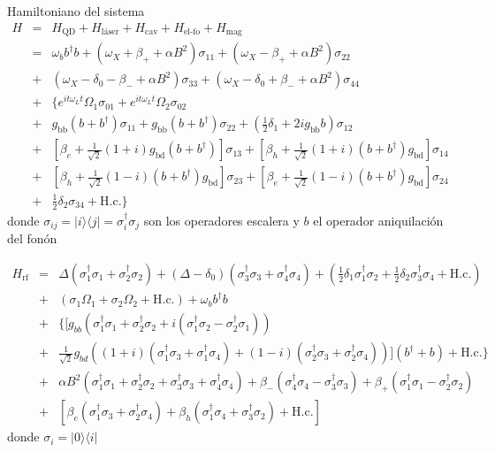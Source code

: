 \documentclass[main.tex]{subfiles}
\begin{document}
Hamiltoniano del sistema
\begin{eqnarray}
	H&=& H_\text{QD} + H_\text{láser} + H_\text{cav} + H_\text{el-fo} + H_\text{mag} \nonumber\\
	&=& \omega_b b^\dagger b + (\omega_X + \beta_+ + \alpha B^2)\sigma_{11} + (\omega_X - \beta_+ +\alpha B^2)\sigma_{22} \nonumber\\
	&+& (\omega_X - \delta_0 - \beta_- + \alpha B^2)\sigma_{33} + (\omega_X - \delta_0 + \beta_- + \alpha B^2)\sigma_{44} \nonumber\\
	&+& \{e^{it\omega_L t}\Omega_1\sigma_{01} + e^{it\omega_L t}\Omega_2\sigma_{02} \nonumber\\
	&+& g_{\text{bb}} (b+b^\dagger) \sigma_{11} + g_{\text{bb}} (b+b^\dagger) \sigma_{22} + (\tfrac{1}{2}\delta_1 + 2ig_{\text{bb}}b)\sigma_{12}\nonumber\\
	&+& [\beta_e + \tfrac{1}{\sqrt{2}} (1+i) g_{\text{bd}} (b+b^\dagger)]\sigma _{13} + [\beta_h + \tfrac{1}{\sqrt{2}}(1+i) (b+b^\dagger) g_{\text{bd}}]\sigma _{14} \nonumber\\
	&+& [\beta _h + \tfrac{1}{\sqrt{2}} (1-i)(b+b^\dagger) g_{\text{bd}}]\sigma_{23} + [\beta_e + \tfrac{1}{\sqrt{2}}(1-i) (b+b^\dagger) g_{\text{bd}}]\sigma_{24}\nonumber\\
	&+& \tfrac{1}{2}\delta _2 \sigma_{34} + \text{H.c.}\}
\end{eqnarray}
donde $\sigma_{ij} = |i\rangle\langle j| = \sigma_i^\dagger\sigma_j$ son los operadores escalera y $b$ el operador aniquilación del fonón

\begin{eqnarray}
	H_\text{rf}&=&\Delta (\sigma_1^{\dagger }\sigma_1 + \sigma_2^\dagger\sigma_2) + (\Delta - \delta_0) (\sigma_3^\dagger\sigma_3 + \sigma_4^\dagger\sigma_4) + (\tfrac{1}{2}\delta_1 \sigma_1^\dagger\sigma_2 + \tfrac{1}{2}\delta_2\sigma_3^\dagger\sigma_4 + \text{H.c.}) \nonumber\\
	&+&(\sigma_1 \Omega_1 + \sigma_2 \Omega_2 + \text{H.c.}) + \omega_b b^\dagger b \nonumber\\
	&+&\{[g_{bb} (\sigma_1^\dagger\sigma_1 + \sigma_2^\dagger\sigma_2 + i (\sigma_1^\dagger\sigma_2 - \sigma_2^\dagger\sigma_1)) \nonumber\\
	&+& \tfrac{1}{\sqrt{2}} g_{bd} ((1+i) (\sigma_1^\dagger\sigma_3 + \sigma_1^\dagger\sigma_4) + (1-i) (\sigma_2^\dagger\sigma_3 + \sigma_2^\dagger\sigma_4))](b^\dagger + b) + \text{H.c.}\} \nonumber\\
	&+& \alpha  B^2(\sigma_1^\dagger\sigma_1 + \sigma_2^\dagger\sigma_2 + \sigma_3^\dagger\sigma_3 + \sigma_4^\dagger\sigma_4) + \beta_- (\sigma_4^\dagger\sigma_4 - \sigma_3^\dagger\sigma_3) + \beta_+(\sigma_1^\dagger\sigma_1 - \sigma_2^\dagger\sigma_2) \nonumber\\
	&+& [\beta_e (\sigma_1^\dagger\sigma_3 + \sigma_2^\dagger\sigma_4) + \beta_h (\sigma _1^\dagger\sigma_4 + \sigma_3^\dagger\sigma_2) + \text{H.c.}]
\end{eqnarray}
donde $\sigma_i = |0\rangle\langle i|$
\end{document}
